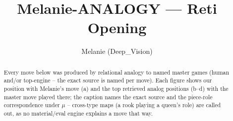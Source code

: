 \documentclass[11pt]{article}
\title{Melanie-ANALOGY — Reti Opening}
\author{Melanie (Deep\_Vision)}
\date{}
\begin{document}
\maketitle

\begin{abstract}Every move below was produced by relational analogy to named master games (human and/or top-engine -- the exact source is named per move). Each figure shows our position with Melanie's move (a) and the top retrieved analog positions (b--d) with the master move played there; the caption names the exact source and the piece-role correspondence under $\mu$ -- cross-type maps (a rook playing a queen's role) are called out, as no material/eval engine explains a move that way.\end{abstract}

\begin{figure}[p]\centering
\begin{subfigure}{0.46\textwidth}\centering
\resizebox{\linewidth}{!}{%
\newchessgame
\chessboard[
  setfen={rnbq1rk1/pp2bppp/4pn2/2pp4/2P5/1P3NP1/P2PPPBP/RNBQ1RK1 w - - 0 7},
  showmover=false,
  pgfstyle=straightmove, color=movearrow, markmove={g2-h3}
]}
\caption{}
\end{subfigure}\hfill
\begin{subfigure}{0.46\textwidth}\centering
\resizebox{\linewidth}{!}{%
\newchessgame
\chessboard[
  setfen={rnbq1rk1/pp2bppp/4pn2/2pp4/2P5/1P3NP1/P2PPPBP/RNBQ1RK1 w - - 0 7},
  showmover=false,
  pgfstyle=straightmove, color=movearrow, markmove={c1-b2}
]}
\caption{}
\end{subfigure}
\\[4pt]
\begin{subfigure}{0.46\textwidth}\centering
\resizebox{\linewidth}{!}{%
\newchessgame
\chessboard[
  setfen={rnbq1rk1/pp2bppp/4pn2/2pp4/2P5/1P3NP1/P2PPPBP/RNBQ1RK1 w - - 0 7},
  showmover=false,
  pgfstyle=straightmove, color=movearrow, markmove={c1-b2}
]}
\caption{}
\end{subfigure}\hfill
\begin{subfigure}{0.46\textwidth}\centering
\resizebox{\linewidth}{!}{%
\newchessgame
\chessboard[
  setfen={rnbq1rk1/pp2bppp/4pn2/2pp4/2P5/1P3NP1/P2PPPBP/RNBQ1RK1 w - - 0 7},
  showmover=false,
  pgfstyle=straightmove, color=movearrow, markmove={c1-b2}
]}
\caption{}
\end{subfigure}

\end{figure}
\end{document}
